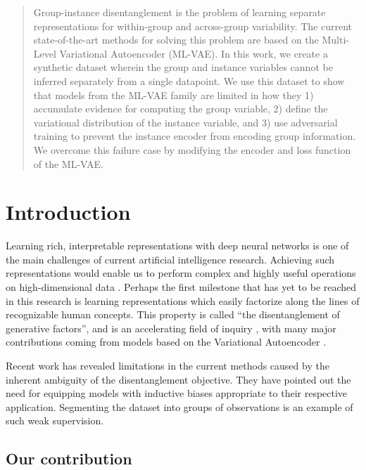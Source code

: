 \documentclass{article}
\begin{document}
\printAffiliationsAndNotice{\icmlEqualContribution} %

\begin{abstract}
Group-instance disentanglement is the problem of learning separate representations for within-group and across-group variability. The current state-of-the-art methods for solving this problem are based on the Multi-Level Variational Autoencoder (ML-VAE). In this work, we create a synthetic dataset wherein the group and instance variables cannot be inferred separately from a single datapoint. We use this dataset to show that models from the ML-VAE family are limited in how they 1) accumulate evidence for computing the group variable, 2) define the variational distribution of the instance variable, and 3) use adversarial training to prevent the instance encoder from encoding group information. We overcome this failure case by modifying the encoder and loss function of the ML-VAE.
\end{abstract}

\section{Introduction}

Learning rich, interpretable representations with deep neural networks is one of the main challenges of current artificial intelligence research. Achieving such representations would enable us to perform complex and highly useful operations on high-dimensional data \citep{bengio2013representation}. Perhaps the first milestone that has yet to be reached in this research is learning representations which easily factorize along the lines of recognizable human concepts. This property is called ``the disentanglement of generative factors'', and is an accelerating field of inquiry \citep{tschannen2018recent}, with many major contributions coming from models based on the Variational Autoencoder \citep{kingma2013auto, rezende2014stochastic}.

Recent work \citep{locatello2018challenging,van2019disentangled} has revealed limitations in the current methods caused by the inherent ambiguity of the disentanglement objective. They have pointed out the need for equipping models with inductive biases appropriate to their respective application. Segmenting the dataset into groups of observations is an example of such weak supervision.

\subsection{Our contribution}
\end{document}
